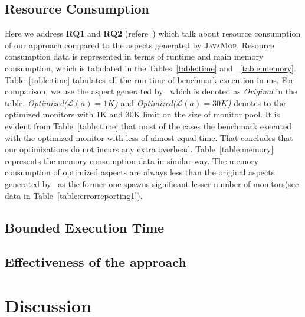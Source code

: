 

\subsection{Resource Consumption}
\label{sec:evaluation:resource}


Here we address \textbf{RQ1} and \textbf{RQ2} (refere~)
which talk about resource consumption of our approach compared to the aspects
generated by \textsc{JavaMop}. Resource consumption data is represented in terms
of runtime and main memory consumption, which is tabulated in the
Tables~\ref{table:time} and ~\ref{table:memory}. Table~\ref{table:time}
tabulates all the run time of benchmark execution in ms. For comparison, we use
the aspect generated by \javamop\ which is denoted as \emph{Original} in the
table. \emph{Optimized($\mathcal{L}(a) = 1K$)} and
\emph{Optimized($\mathcal{L}(a) = 30K$)} denotes to the optimized monitors with
$1$K and $30$K limit on the size of monitor pool.
It is evident from Table~\ref{table:time} that most of the cases the benchmark
executed with the optimized monitor with less of almost equal time. That
concludes that our optimizations do not incurs any extra overhead.
Table~\ref{table:memory} represents the memory consumption data in similar way.
The memory consumption of optimized aspects are always less than the original
aspects generated by \javamop\ as the former one spawns significant lesser number
of monitors(see data in Table~\ref{table:errorreporting1}).


\subsection{Bounded Execution Time}
\label{sec:evaluation:bounded}


\subsection{Effectiveness of the approach}
\label{sec:evaluation:effectiveness}


\section{Discussion}
\label{sec:discussion}



